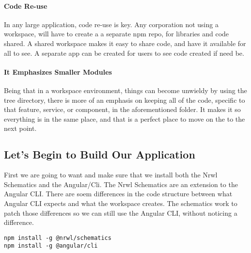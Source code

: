 \paragraph{Code Re-use}
In any large application, code re-use is key. Any corporation not using a
workspace, will have to create a a separate npm repo, for libraries and code
shared. A shared workspace makes it easy to share code, and have it available
for all to see. A separate app can be created for users to see code created if
need be.

\paragraph{It Emphasizes Smaller Modules}
Being that in a workspace environment, things can become unwieldy by using the
tree directory, there is more of an emphasis on keeping all of the code,
specific to that feature, service, or component, in the aforementioned folder.
It makes it so everything is in the same place, and that is a perfect place to
move on the to the next point.

\subsection{Let's Begin to Build Our Application}

First we are going to want and make sure that we install both the Nrwl Schematics
and the Angular/Cli. The Nrwl Schematics are an extension to the Angular CLI.
There are soem differences in the code structure between what Angular CLI expects
and what the workspace creates. The schematics work to patch those differences
so we can still use the Angular CLI, without noticing a difference.

\begin{verbatim}
npm install -g @nrwl/schematics
npm install -g @angular/cli
\end{verbatim}
